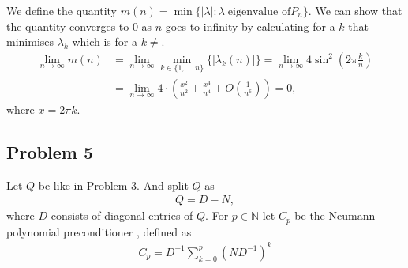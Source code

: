 \subsubsection{}
We define the quantity $m(n) = \min\{|\lambda|:\lambda\; \text{eigenvalue of
$P_n$}\}$. We can show that the quantity converges to 0 as $n$ goes to
infinity by calculating for a $k$ that minimises $\lambda_k$ which is for a
$k\neq$.
\begin{align}
    \lim_{n \to \infty}m(n)
    &= \lim_{n \to \infty}\min_{k\in\{1,\ldots,n\}}\{|\lambda_k(n)|\} = \lim_{n
    \to \infty}4\sin^2\left(2\pi \frac{k}{n}\right)\\
    &= \lim_{n \to \infty}4\cdot\left(\frac{x^2}{n^{2}} + \frac{x^{4}}{n^{4}}
    + O(\frac{1}{n^{6}})\right) = 0,
\end{align}
where $x = 2\pi k$.
\subsection{Problem 5}
Let $Q$ be like in Problem 3. And split $Q$ as
\begin{align}
    Q = D-N,
\end{align}
where $D$ consists of diagonal entries of $Q$. For $p \in \mathbb{N}$ let $C_p$ be the
Neumann polynomial preconditioner , defined as
\begin{align}
    C_p = D^{-1}\sum_{k=0}^{p} \left( ND^{-1} \right)^{k}
\end{align}
\subsubsection{}
